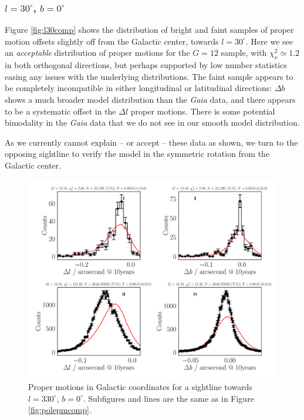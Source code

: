 \documentclass[fleqn,usenatbib]{mnras}
\begin{document}
\subsubsection{$l = 30^\circ$, $b = 0^\circ$}
Figure \ref{fig:l30comp} shows the distribution of bright and faint samples of proper motion offsets slightly off from the Galactic center, towards $l = 30^\circ$. Here we see an \textit{acceptable} distribution of proper motions for the $G = 12$ sample, with $\chi_\nu^2 \simeq 1.2$ in both orthogonal directions, but perhaps supported by low number statistics easing any issues with the underlying distributions. The faint sample appears to be completely incompatible in either longitudinal or latitudinal directions: $\Delta b$ shows a much broader model distribution than the \textit{Gaia} data, and there appears to be a systematic offset in the $\Delta l$ proper motions. There is some potential bimodality in the \textit{Gaia} data that we do not see in our smooth model distribution.

As we currently cannot explain -- or accept -- these data as shown, we turn to the opposing sightline to verify the model in the symmetric rotation from the Galactic center.

\begin{figure}
    \centering
    \includegraphics[width=\columnwidth]{Plots/plots_pm_gaia_330_0.pdf}
    \caption{Proper motions in Galactic coordinates for a sightline towards $l = 330^\circ$, $b = 0^\circ$. Subfigures and lines are the same as in Figure \ref{fig:polepmcomp}.}
    \label{fig:l330comp}
\end{figure}
\end{document}
